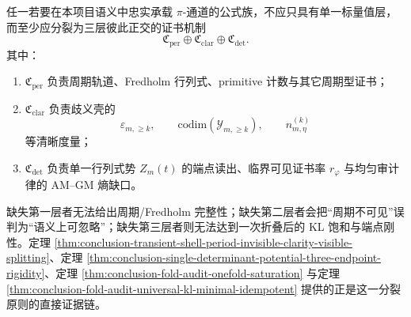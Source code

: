 \begin{conjecture}\label{conj:conclusion-faithful-pi-formula-three-layer-certificate-splitting}
任一若要在本项目语义中忠实承载 \(\pi\)-通道的公式族，不应只具有单一标量值层，而至少应分裂为三层彼此正交的证书机制
\[
\mathfrak C_{\mathrm{per}}
\oplus
\mathfrak C_{\mathrm{clar}}
\oplus
\mathfrak C_{\det}.
\]
其中：
\begin{enumerate}
\normalfont
  \item \(\mathfrak C_{\mathrm{per}}\) 负责周期轨道、Fredholm 行列式、primitive 计数与其它周期型证书；
  \item \(\mathfrak C_{\mathrm{clar}}\) 负责歧义壳的
  \[
  \varepsilon_{m,\ge k},\qquad \mathrm{codim}(\mathcal Y_{m,\ge k}),\qquad n_{m,\eta}^{(k)}
  \]
  等清晰度量；
  \item \(\mathfrak C_{\det}\) 负责单一行列式势 \(Z_m(t)\) 的端点读出、临界可见证书率 \(r_\varphi\) 与均匀审计律的 AM--GM 熵缺口。
\end{enumerate}
缺失第一层者无法给出周期/Fredholm 完整性；缺失第二层者会把“周期不可见”误判为“语义上可忽略”；缺失第三层者则无法达到一次折叠后的 KL 饱和与端点刚性。定理 \ref{thm:conclusion-transient-shell-period-invisible-clarity-visible-splitting}、定理 \ref{thm:conclusion-single-determinant-potential-three-endpoint-rigidity}、定理 \ref{thm:conclusion-fold-audit-onefold-saturation} 与定理 \ref{thm:conclusion-fold-audit-universal-kl-minimal-idempotent} 提供的正是这一分裂原则的直接证据链。
\end{conjecture}

